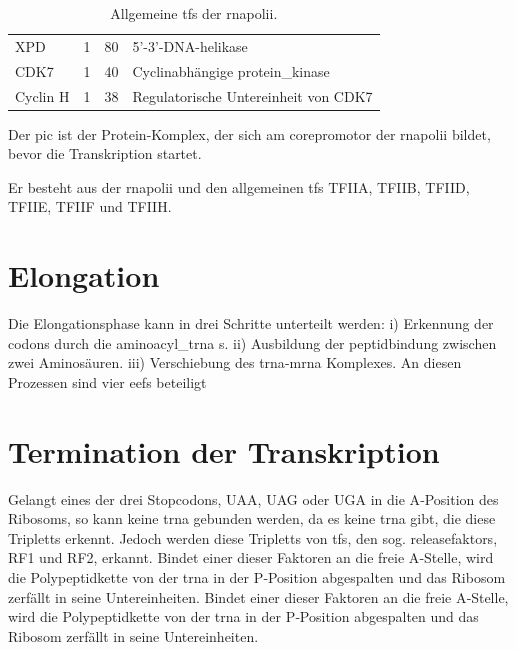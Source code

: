\begin{table}[ht]
\begin{tabular}{|l|c|c|p{8cm}|}
        XPD                  & 1                       & 80                       & 5'-3'-DNA-\gls{helikase}                              \\
        CDK7                 & 1                       & 40                       & Cyclinabhängige \gls{protein_kinase}                  \\
        Cyclin H             & 1                       & 38                       & Regulatorische Untereinheit von CDK7            \\
        \hline
    \end{tabular}
    \caption{Allgemeine \glspl{tf} der \gls{rnapolii}.}
    \label{tab:tfII}
\end{table}

Der \gls{pic} ist der Protein-Komplex, der sich am \gls{corepromotor} der \gls{rnapolii} bildet, bevor die
Transkription
startet.

Er besteht aus der \gls{rnapolii} und den allgemeinen \glspl{tf} TFIIA, TFIIB, TFIID, TFIIE, TFIIF und TFIIH.



\section{Elongation}\label{sec:elongation}
Die Elongationsphase kann in drei Schritte unterteilt werden: i) Erkennung der \glspl{codon} durch die \gls{aminoacyl_trna}
s. ii) Ausbildung der \gls{peptidbindung} zwischen zwei Aminosäuren.
iii) Verschiebung des \gls{trna}‐\gls{mrna} Komplexes.
An diesen Prozessen sind vier \glspl{eef} beteiligt


\section{Termination der Transkription}\label{sec:termination-der-transkription}
Gelangt eines der drei Stopcodons, UAA, UAG oder UGA in die A‑Position des Ribosoms, so kann keine \gls{trna} gebunden
werden, da es keine \gls{trna} gibt, die diese Tripletts erkennt.
Jedoch werden diese Tripletts von \glspl{tf}, den sog. \glspl{releasefaktor},
RF1 und RF2, erkannt.
Bindet einer dieser Faktoren an die freie
A‑Stelle, wird die Polypeptidkette von der \gls{trna} in der P‑Position
abgespalten und das Ribosom zerfällt in seine Untereinheiten.
Bindet einer dieser Faktoren an die freie A‑Stelle, wird die Polypeptidkette von der \gls{trna} in der P‑Position
abgespalten und das Ribosom zerfällt in seine Untereinheiten. \cite{Knust2025_9}

